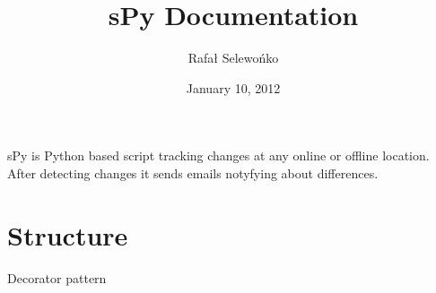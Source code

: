 \documentclass[letterpaper,10pt,english]{sphinxmanual}
\title{sPy Documentation}
\date{January 10, 2012}
\author{Rafał Selewońko}
\begin{document}
\maketitle
\tableofcontents
{}\label{index::doc}


sPy is Python based script tracking changes at any online or offline location.
After detecting changes it sends emails notyfying about differences.


\chapter{Structure}
\label{index:welcome-to-spy-s-documentation}\label{index:structure}\label{index:module-spy}

\begin{fulllineitems}
\label{index:spy.AbstractDecorator}
Decorator pattern

\begin{fulllineitems}
\label{index:spy.AbstractDecorator.compare}
\end{fulllineitems}


\begin{fulllineitems}
\label{index:spy.AbstractDecorator.download_new_content}
\end{fulllineitems}


\begin{fulllineitems}
\label{index:spy.AbstractDecorator.download_old_content}
\end{fulllineitems}


\begin{fulllineitems}
\label{index:spy.AbstractDecorator.get_diff}
\end{fulllineitems}



\end{fulllineitems}
\end{document}
